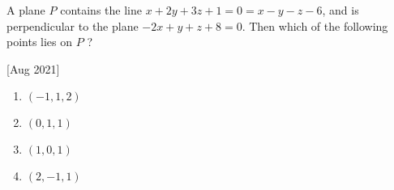     \item A plane $P$ contains the line $x+2y+3z+1=0=x-y-z-6$, and is perpendicular to the plane $-2x+y+z+8=0$. Then which of the following points lies on $P$ ?
    
    \hfill[Aug 2021]
        \begin{enumerate}
            \item $(-1, 1, 2)$
            \item $(0, 1, 1)$
            \item $(1, 0, 1)$
            \item $(2, -1, 1)$
        \end{enumerate}

